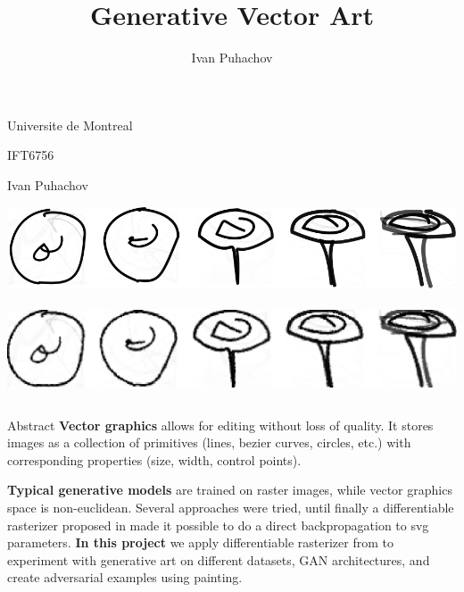 \documentclass{beamer}
\author[ivan.puhachov@umontreal.ca]{Ivan Puhachov}
\title{Generative Vector Art}
\institute{Universite de Montreal}
\begin{document}
\begin{frame}[fragile]
	\begin{center}
		\vspace{5mm}
		
		{\LARGE Universite de Montreal}
		\vspace{7mm}
		
		{\LARGE IFT6756}\vspace{7mm}
		
		{\LARGE Ivan Puhachov}
	\end{center}
\begin{block}{}
	\begin{center}
	\includegraphics[width=0.45\linewidth]{images/my_plot_vector.png}
	\hspace{1cm}
	\unskip\ \vrule\
	\hspace{1cm}
	\includegraphics[width=0.45\linewidth]{images/my_plot_raster.png}
\end{center}
\end{block}
	

\begin{columns}[T]

\begin{column}{.33\textwidth}

\begin{block}{Abstract}
\textbf{Vector graphics} allows for editing without loss of quality. It stores images as a collection of primitives (lines, bezier curves, circles, etc.) with corresponding properties (size, width, control points).

\textbf{Typical generative models} are trained on raster images, while vector graphics space is non-euclidean. Several approaches were tried, until finally a differentiable rasterizer proposed in \cite{diffsvg} made it possible to do a direct backpropagation to svg parameters. 
\linebreak
\linebreak
\textbf{In this project} we apply differentiable rasterizer from \cite{diffsvg} to experiment with generative art on different datasets, GAN architectures, and create adversarial examples using painting.

\end{block}


\end{column}
\end{columns}
\end{frame}
\end{document}
